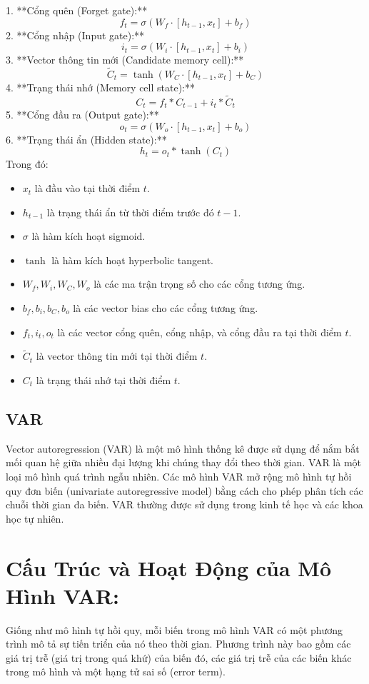 \documentclass[conference]{IEEEtran}
\begin{document}
1. **Cổng quên (Forget gate):**
\[
f_t = \sigma(W_f \cdot [h_{t-1}, x_t] + b_f)
\]
2. **Cổng nhập (Input gate):**
\[
i_t = \sigma(W_i \cdot [h_{t-1}, x_t] + b_i)
\]
3. **Vector thông tin mới (Candidate memory cell):**
\[
\tilde{C}_t = \tanh(W_C \cdot [h_{t-1}, x_t] + b_C)
\]
4. **Trạng thái nhớ (Memory cell state):**
\[
C_t = f_t * C_{t-1} + i_t * \tilde{C}_t
\]
5. **Cổng đầu ra (Output gate):**
\[
o_t = \sigma(W_o \cdot [h_{t-1}, x_t] + b_o)
\]
6. **Trạng thái ẩn (Hidden state):**
\[
h_t = o_t * \tanh(C_t)
\]
Trong đó:
\begin{itemize}
    \item \( x_t \) là đầu vào tại thời điểm \( t \).
    \item \( h_{t-1} \) là trạng thái ẩn từ thời điểm trước đó \( t-1 \).
    \item \( \sigma \) là hàm kích hoạt sigmoid.
    \item \( \tanh \) là hàm kích hoạt hyperbolic tangent.
    \item \( W_f, W_i, W_C, W_o \) là các ma trận trọng số cho các cổng tương ứng.
    \item \( b_f, b_i, b_C, b_o \) là các vector bias cho các cổng tương ứng.
    \item \( f_t, i_t, o_t \) là các vector cổng quên, cổng nhập, và cổng đầu ra tại thời điểm \( t \).
    \item \( \tilde{C}_t \) là vector thông tin mới tại thời điểm \( t \).
    \item \( C_t \) là trạng thái nhớ tại thời điểm \( t \).
\end{itemize}
\subsection{VAR}
Vector autoregression (VAR) là một mô hình thống kê được sử dụng để nắm bắt mối quan hệ giữa nhiều đại lượng khi chúng thay đổi theo thời gian. VAR là một loại mô hình quá trình ngẫu nhiên. Các mô hình VAR mở rộng mô hình tự hồi quy đơn biến (univariate autoregressive model) bằng cách cho phép phân tích các chuỗi thời gian đa biến. VAR thường được sử dụng trong kinh tế học và các khoa học tự nhiên.
\section*{Cấu Trúc và Hoạt Động của Mô Hình VAR:}
Giống như mô hình tự hồi quy, mỗi biến trong mô hình VAR có một phương trình mô tả sự tiến triển của nó theo thời gian. Phương trình này bao gồm các giá trị trễ (giá trị trong quá khứ) của biến đó, các giá trị trễ của các biến khác trong mô hình và một hạng tử sai số (error term).
\end{document}
